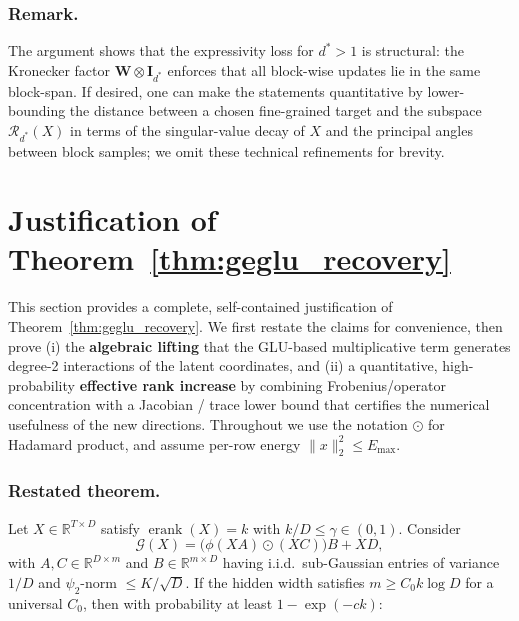 \documentclass[sigconf,screen]{acmart}
\begin{document}
\subsubsection*{\bf Remark.}
The argument shows that the expressivity loss for \(d^{\ast}>1\) is structural: the Kronecker factor \(\mathbf W\otimes\mathbf I_{d^{\ast}}\) enforces that all block-wise updates lie in the same block-span. If desired, one can make the statements quantitative by lower-bounding the distance between a chosen fine-grained target and the subspace \(\mathcal R_{d^{\ast}}(X)\) in terms of the singular-value decay of \(X\) and the principal angles between block samples; we omit these technical refinements for brevity.


\section{Justification of Theorem~\ref{thm:geglu_recovery}}
\label{app:thm:geglu_recovery}

This section provides a complete, self-contained justification of Theorem~\ref{thm:geglu_recovery}.  We first restate the claims for convenience, then prove (i) the \textbf{algebraic lifting} that the GLU-based multiplicative term generates degree-2 interactions of the latent coordinates, and (ii) a quantitative, high-probability \textbf{effective rank increase} by combining Frobenius/operator concentration with a Jacobian / trace lower bound that certifies the numerical usefulness of the new directions.  Throughout we use the notation \(\odot\) for Hadamard product, and assume per-row energy \(\|x\|_2^2\le E_{\max}\).

\subsubsection*{\bf Restated theorem.}
Let \(X\in\mathbb R^{T\times D}\) satisfy \(\operatorname{erank}(X)=k\) with \(k/D\le\gamma\in(0,1)\). Consider
\[
\mathcal G(X)=\big(\phi(XA)\odot (X C)\big)B + X D,
\]
with \(A,C\in\mathbb R^{D\times m}\) and \(B\in\mathbb R^{m\times D}\) having i.i.d.\ sub-Gaussian entries of variance \(1/D\) and \(\psi_2\)-norm \(\le K/\sqrt D\). If the hidden width satisfies \(m\ge C_0 k\log D\) for a universal \(C_0\), then with probability at least \(1-\exp(-c k)\):
\end{document}

